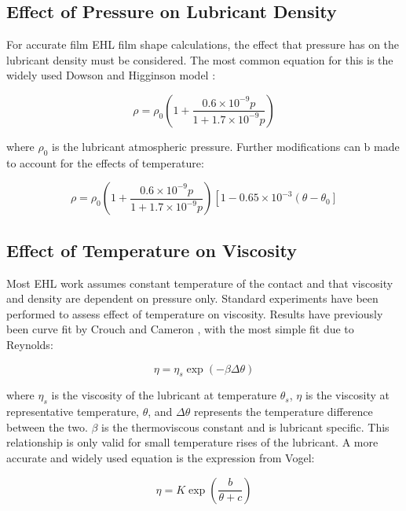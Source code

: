 \subsection{Effect of Pressure on Lubricant Density}

For accurate film EHL film shape calculations, the effect that pressure has on the lubricant density must be considered. The most common equation for this is the widely used Dowson and Higginson model \cite{Dowson1977}:

\begin{equation}\label{eq3.29}
	\rho=\rho_0\left(1+\frac{0.6 \times 10^{-9} p}{1+1.7 \times 10^{-9} p}\right)
\end{equation}

where $\rho_0$ is the lubricant atmospheric pressure. Further modifications can b made to account for the effects of temperature:

\begin{equation}\label{eq3.30}
	\rho=\rho_0\left(1+\frac{0.6 \times 10^{-9} p}{1+1.7 \times 10^{-9} p}\right)\left[1-0.65 \times 10^{-3}\left(\theta-\theta_0\right]\right.
\end{equation}


\subsection{Effect of Temperature on Viscosity}

Most EHL work assumes constant temperature of the contact and that viscosity and density are dependent on pressure only. Standard experiments have been performed to assess effect of temperature on viscosity. Results have previously been curve fit by Crouch and Cameron \cite{Crouch1961}, with the most simple fit due to Reynolds:

\begin{equation}\label{eq3.31}
	\eta=\eta_s \exp (-\beta \Delta \theta)
\end{equation}

where $\eta_s$ is the viscosity of the lubricant at temperature $\theta_s$, $\eta$ is the viscosity at representative temperature, $\theta$, and $\Delta \theta$ represents the temperature difference between the two. $\beta$ is the thermoviscous constant and is lubricant specific. This relationship is only valid for small temperature rises of the lubricant. A more accurate and widely used equation is the expression from Vogel:

\begin{equation}\label{eq3.32}
	\eta=K \exp \left(\frac{b}{\theta+c}\right)
\end{equation}

